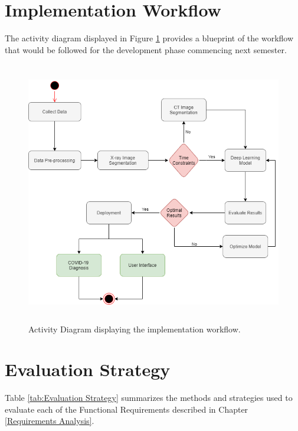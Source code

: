 \vspace{-2em}
\section{Implementation Workflow}
The activity diagram displayed in Figure \ref{fig:Implementation Methodology} provides a blueprint of the workflow that would be followed for the development phase commencing next semester. 


\begin{figure}[H]
 \centering
 \includegraphics[width=15.5cm, height=11.5cm]{Images/activityDiagram.png}
 \decoRule
 \caption[Implementation Methodology]{Activity Diagram displaying the implementation workflow.}
 \label{fig:Implementation Methodology}
 \end{figure}
 
 \vspace{-2em}
\section{Evaluation Strategy} \label{Evaluation Strategy Section}
Table \ref{tab:Evaluation Strategy} summarizes the methods and strategies used to evaluate each of the Functional Requirements described in Chapter \ref{Requirements Analysis}.

